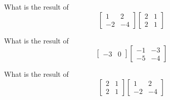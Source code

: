\bexo
What is the result of 
\begin{equation*}
\left[
\begin{array}{cc}
1 & 2\\
-2 & -4
\end{array}
\right]
\left[
\begin{array}{cc}
2 & 1\\
2 & 1 
\end{array}
\right]
\end{equation*}
\eexo

\solution{
\begin{equation*}
\left[
\begin{array}{cc}
6 & 3\\
-12 & -6
\end{array}
\right]
\end{equation*}
}

\bexo
What is the result of 
\begin{equation*}
\left[
\begin{array}{cc}
-3 & 0
\end{array}
\right]
\left[
\begin{array}{cc}
    -1   & -3\\
    -5   & -4
\end{array}
\right]
\end{equation*}
\eexo
\solution{
\begin{equation*}
\left[
\begin{array}{cc}
3&9
\end{array}
\right]
\end{equation*}
}

\bexo
What is the result of 
\begin{equation*}
\left[
\begin{array}{cc}
2 & 1\\
2 & 1 
\end{array}
\right]
\left[
\begin{array}{cc}
1 & 2\\
-2 & -4
\end{array}
\right]
\end{equation*}
\eexo
\solution{
\begin{equation*}
\left[
\begin{array}{cc}
   0  &   0\\
   0  &  0
\end{array}
\right]
\end{equation*}
}



